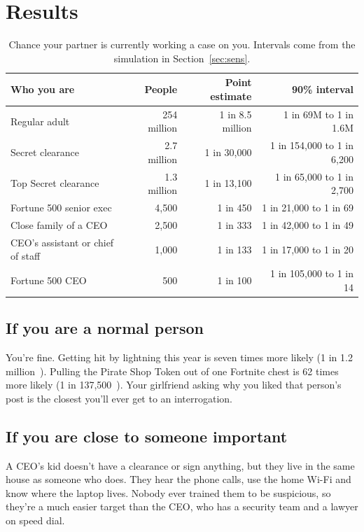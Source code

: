 \documentclass[11pt]{article}
\theoremstyle{definition}
\begin{document}
\section{Results}

\begin{table}[H]
\centering\small
\begin{tabular}{lrrr}
\toprule
Who you are & People & Point estimate & 90\% interval \\
\midrule
Regular adult & 254 million & 1 in 8.5 million & 1 in 69M to 1 in 1.6M \\
Secret clearance & 2.7 million & 1 in 30{,}000 & 1 in 154{,}000 to 1 in 6{,}200 \\
Top Secret clearance & 1.3 million & 1 in 13{,}100 & 1 in 65{,}000 to 1 in 2{,}700 \\
Fortune 500 senior exec & 4{,}500 & 1 in 450 & 1 in 21{,}000 to 1 in 69 \\
Close family of a CEO & 2{,}500 & 1 in 333 & 1 in 42{,}000 to 1 in 49 \\
CEO's assistant or chief of staff & 1{,}000 & 1 in 133 & 1 in 17{,}000 to 1 in 20 \\
Fortune 500 CEO & 500 & 1 in 100 & 1 in 105{,}000 to 1 in 14 \\
\bottomrule
\end{tabular}
\caption{Chance your partner is currently working a case on you. Intervals come from the simulation in Section~\ref{sec:sens}.}
\end{table}

\subsection{If you are a normal person}

You're fine. Getting hit by lightning this year is seven times more likely (1 in 1.2 million~\cite{nws}). Pulling the Pirate Shop Token out of one Fortnite chest is 62 times more likely (1 in 137{,}500~\cite{epic}). Your girlfriend asking why you liked that person's post is the closest you'll ever get to an interrogation.

\subsection{If you are close to someone important}

A CEO's kid doesn't have a clearance or sign anything, but they live in the same house as someone who does. They hear the phone calls, use the home Wi-Fi and know where the laptop lives. Nobody ever trained them to be suspicious, so they're a much easier target than the CEO, who has a security team and a lawyer on speed dial.
\end{document}
